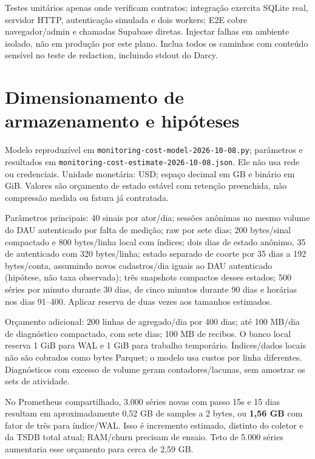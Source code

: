 \documentclass[10pt,a4paper]{article}
\begin{document}
Testes unitários apenas onde verificam contratos; integração exercita
SQLite real, servidor HTTP, autenticação simulada e dois workers; E2E
cobre navegador/admin e chamadas Supabase diretas. Injectar falhas em
ambiente isolado, não em produção por este plano. Inclua todos os
caminhos com conteúdo sensível no teste de redaction, incluindo stdout
do Darcy.

\clearpage
\section{Dimensionamento de armazenamento e
hipóteses}\label{dimensionamento-de-armazenamento-e-hipuxf3teses}

Modelo reproduzível em {\footnotesize\ttfamily\nolinkurl{monitoring-cost-model-2026-10-08.py}};
parâmetros e resultados em
{\footnotesize\ttfamily\nolinkurl{monitoring-cost-estimate-2026-10-08.json}}. Ele não usa rede ou
credenciais. Unidade monetária: USD; espaço decimal em GB e binário em
GiB. Valores são orçamento de estado estável com retenção preenchida,
não compressão medida ou fatura já contratada.

Parâmetros principais: 40 sinais por ator/dia; sessões anônimas no mesmo
volume do DAU autenticado por falta de medição; raw por sete dias; 200
bytes/sinal compactado e 800 bytes/linha local com índices; dois dias de
estado anônimo, 35 de autenticado com 320 bytes/linha; estado separado
de coorte por 35 dias a 192 bytes/conta, assumindo novos cadastros/dia
iguais ao DAU autenticado (hipótese, não taxa observada); três snapshots
compactos desses estados; 500 séries por minuto durante 30 dias, de
cinco minutos durante 90 dias e horárias nos dias 91--400. Aplicar
reserva de duas vezes aos tamanhos estimados.

Orçamento adicional: 200 linhas de agregado/dia por 400 dias; até 100
MB/dia de diagnóstico compactado, com sete dias; 100 MB de recibos. O
banco local reserva 1 GiB para WAL e 1 GiB para trabalho temporário.
Índices/dados locais não são cobrados como bytes Parquet; o modelo usa
custos por linha diferentes. Diagnósticos com excesso de volume geram
contadores/lacunas, sem amostrar os sets de atividade.

No Prometheus compartilhado, 3.000 séries novas com passo 15s e 15 dias
resultam em aproximadamente 0,52 GB de samples a 2 bytes, ou
\textbf{1,56 GB} com fator de três para índice/WAL. Isso é incremento
estimado, distinto do coletor e da TSDB total atual; RAM/churn precisam
de ensaio. Teto de 5.000 séries aumentaria esse orçamento para cerca de
2,59 GB.
\end{document}
